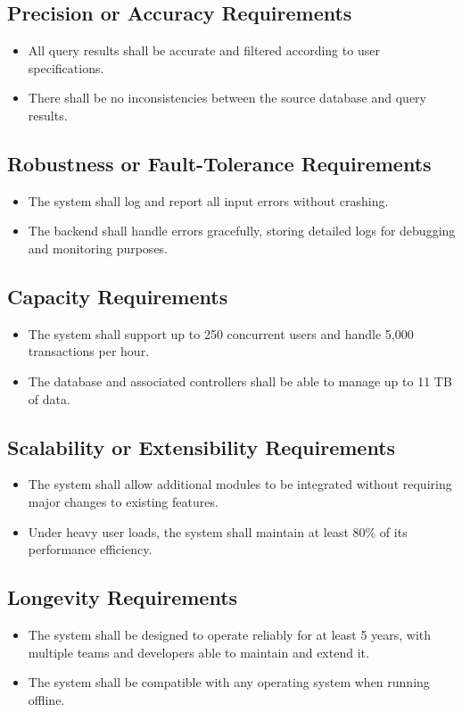 \documentclass[12pt]{article}
\begin{document}
\subsection{Precision or Accuracy Requirements}
\begin{itemize}
    \item All query results shall be accurate and filtered according to user specifications.
    \item There shall be no inconsistencies between the source database and query results.
\end{itemize}

\subsection{Robustness or Fault-Tolerance Requirements}
\begin{itemize}
    \item The system shall log and report all input errors without crashing.
    \item The backend shall handle errors gracefully, storing detailed logs for debugging and monitoring purposes.
\end{itemize}

\subsection{Capacity Requirements}
\begin{itemize}
    \item The system shall support up to 250 concurrent users and handle 5,000 transactions per hour.
    \item The database and associated controllers shall be able to manage up to 11 TB of data.
\end{itemize}

\subsection{Scalability or Extensibility Requirements}
\begin{itemize}
    \item The system shall allow additional modules to be integrated without requiring major changes to existing features.
    \item Under heavy user loads, the system shall maintain at least 80\% of its performance efficiency.
\end{itemize}

\subsection{Longevity Requirements}
\begin{itemize}
    \item The system shall be designed to operate reliably for at least 5 years, with multiple teams and developers able to maintain and extend it.
    \item The system shall be compatible with any operating system when running offline.
\end{itemize}
\end{document}
